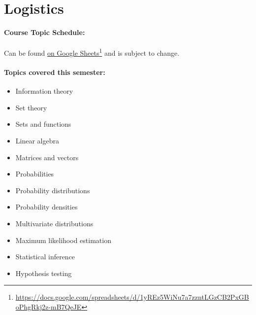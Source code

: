 \documentclass[12pt]{scrartcl}
\begin{document}


\clearpage
\section{Logistics}

\paragraph{Course Topic Schedule:} Can be found \href{https://docs.google.com/spreadsheets/d/1yREz5WiNu7a7zzntLGzCB2PxGBoPhgRkj2z-mB7QeJE}{on Google Sheets}\footnote{\url{https://docs.google.com/spreadsheets/d/1yREz5WiNu7a7zzntLGzCB2PxGBoPhgRkj2z-mB7QeJE}}
and is subject to change.


\paragraph{Topics covered this semester:}

\begin{multicols}{2}
\begin{itemize}
\item Information theory %
\item Set theory %
\item Sets and functions
\item Linear algebra
\item Matrices and vectors
\item Probabilities
\item Probability distributions 
\item Probability densities
\item Multivariate distributions
\item Maximum likelihood estimation
\item Statistical inference
\item Hypothesis testing
\end{itemize}
\end{multicols}
\end{document}
